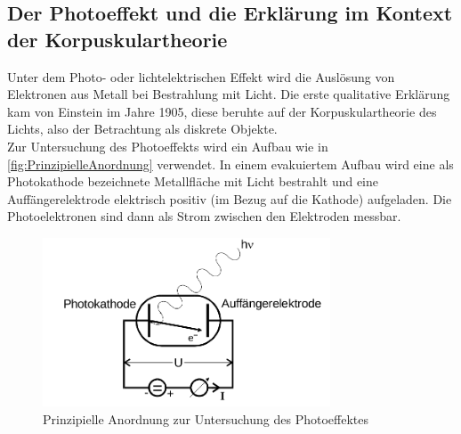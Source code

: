 \subsection{Der Photoeffekt und die Erklärung im Kontext der Korpuskulartheorie}
\label{sec:Der Photoeffekt und die Erklärung im Kontext der Korpuskulartheorie}
Unter dem Photo- oder lichtelektrischen Effekt wird die Auslösung von Elektronen aus
Metall bei Bestrahlung mit Licht. Die erste qualitative Erklärung kam von Einstein im
Jahre 1905, diese beruhte auf der Korpuskulartheorie des Lichts, also der Betrachtung als
diskrete Objekte.
\\
Zur Untersuchung des Photoeffekts wird ein Aufbau wie in
\autoref{fig:PrinzipielleAnordnung} verwendet. In einem evakuiertem Aufbau wird eine als
Photokathode bezeichnete Metallfläche mit Licht bestrahlt und eine Auffängerelektrode
elektrisch positiv (im Bezug auf die Kathode) aufgeladen. Die Photoelektronen sind dann
als Strom zwischen den Elektroden messbar.
\begin{figure}
	\centering
	\includegraphics[height=5cm]{pictures/PrinzipielleAnordnung.png}
	\caption{Prinzipielle Anordnung zur Untersuchung des Photoeffektes}
	\label{fig:PrinzipielleAnordnung}
\end{figure}

